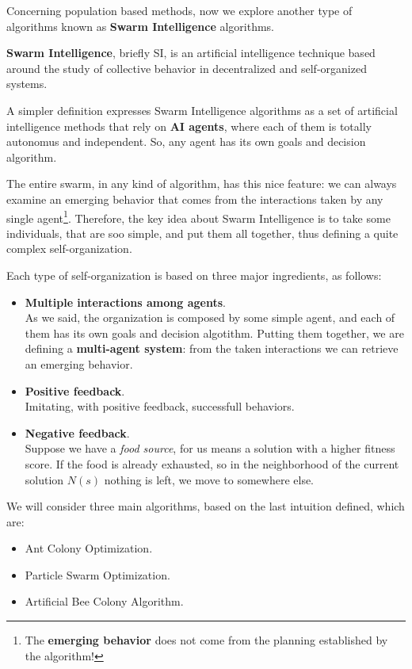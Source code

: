 Concerning population based methods, now we explore another type of algorithms known as \textbf{Swarm Intelligence} algorithms.
\begin{definition}
    \textbf{Swarm Intelligence}, briefly SI, is an artificial intelligence technique based around the study of collective behavior in decentralized and self-organized systems.
\end{definition}

A simpler definition expresses Swarm Intelligence algorithms as a set of artificial intelligence methods that rely on \textbf{AI agents}, where each of them is totally autonomus
and independent. So, any agent has its own goals and decision algorithm. \vspace{3.5pt}

The entire swarm, in any kind of algorithm, has this nice feature: we can always examine an emerging behavior that comes from the interactions taken by any single agent\footnote{The \textbf{emerging behavior} does not come from the planning established by the algorithm!}.
Therefore, the key idea about Swarm Intelligence is to take some individuals, that are soo simple, and put them all together, thus defining a quite complex self-organization. \vspace{3.5pt}

Each type of self-organization is based on three major ingredients, as follows:
\begin{itemize}[nosep]
    \renewcommand{\labelitemi}{-}
    \item \textbf{Multiple interactions among agents}. \\ As we said, the organization is composed by some simple agent, and each of them has its own goals and decision algotithm. Putting them together, we are defining a \textbf{multi-agent system}: from the taken interactions we can retrieve an emerging behavior.
    \item \textbf{Positive feedback}. \\ Imitating, with positive feedback, successfull behaviors. 
    \item \textbf{Negative feedback}. \\ Suppose we have a \textit{food source}, for us means a solution with a higher fitness score. If the food is already exhausted, so in the neighborhood of the current solution $N(s)$ nothing is left, we move to somewhere else.
\end{itemize}

We will consider three main algorithms, based on the last intuition defined, which are:
\begin{itemize}[nosep]
    \renewcommand{\labelitemi}{-}
    \item Ant Colony Optimization.
    \item Particle Swarm Optimization.
    \item Artificial Bee Colony Algorithm.
\end{itemize}